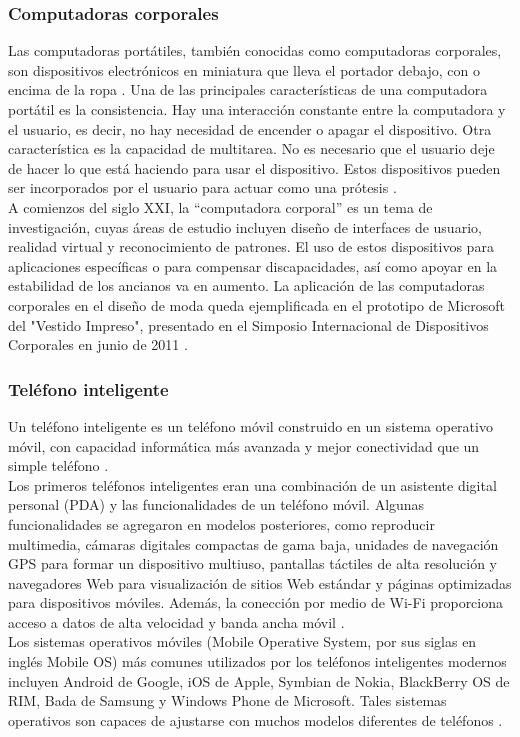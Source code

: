 \subsubsection{Computadoras corporales}

Las computadoras portátiles, también conocidas como computadoras corporales, son dispositivos electrónicos en miniatura que lleva el portador debajo, con o encima de la ropa . Una de las principales características de una computadora portátil es la consistencia. Hay una interacción constante entre la computadora y el usuario, es decir, no hay necesidad de encender o apagar el dispositivo. Otra característica es la capacidad de multitarea. No es necesario que el usuario deje de hacer lo que está haciendo para usar el dispositivo. Estos dispositivos pueden ser incorporados por el usuario para actuar como una prótesis \cite{MBPDO}.  \\

A comienzos del siglo XXI, la ``computadora corporal'' es un tema de investigación, cuyas áreas de estudio incluyen diseño de interfaces de usuario, realidad virtual y reconocimiento de patrones. El uso de estos dispositivos para aplicaciones específicas o para compensar discapacidades, así como apoyar en la estabilidad de los ancianos va en aumento. La aplicación de las computadoras corporales en el diseño de moda queda ejemplificada en el prototipo de Microsoft del "Vestido Impreso", presentado en el Simposio Internacional de Dispositivos Corporales en junio de 2011 \cite{MBCC}. \\

\subsubsection{Teléfono inteligente}

Un teléfono inteligente es un teléfono móvil construido en un sistema operativo móvil, con capacidad informática más avanzada y mejor conectividad que un simple teléfono \cite{MBPDO}. \\
 
Los primeros teléfonos inteligentes eran una combinación de un asistente digital personal (PDA) y las funcionalidades de un teléfono móvil. Algunas funcionalidades se agregaron en modelos posteriores, como reproducir multimedia, cámaras digitales compactas de gama baja, unidades de navegación GPS para formar un dispositivo multiuso, pantallas táctiles de alta resolución y navegadores Web para visualización de sitios Web estándar y páginas optimizadas para dispositivos móviles. Además, la conección por medio de Wi-Fi proporciona acceso a datos de alta velocidad y banda ancha móvil \cite{MBPDO}. \\

Los sistemas operativos móviles (Mobile Operative System, por sus siglas en inglés Mobile OS) más comunes utilizados por los teléfonos inteligentes modernos incluyen Android de Google, iOS de Apple, Symbian de Nokia, BlackBerry OS de RIM, Bada de Samsung y Windows Phone de Microsoft. Tales sistemas operativos son capaces de ajustarse con muchos modelos diferentes de teléfonos \cite{MBPDO}.  \\


